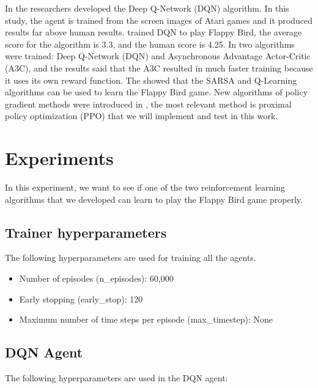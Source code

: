 \documentclass[letterpaper]{article}
\begin{document}
In \cite{mnih2013playing} the researchers developed the Deep Q-Network (DQN) algorithm. In this study, the agent is trained from the screen images of Atari games and it produced results far above human results. \cite{stanford2016alp} trained DQN to play Flappy Bird, the average score for the algorithm is 3.3, and the human score is 4.25. In \cite{alp2019playing} two algorithms were trained: Deep Q-Network (DQN) and Asynchronous Advantage Actor-Critic (A3C), and the results said that the A3C resulted in much faster training because it uses its own reward function. The \cite{vu2020flapai} showed that the SARSA and Q-Learning algorithms can be used to learn the Flappy Bird game. New algorithms of policy gradient methods were introduced in \cite{schulman2017proximal}, the most relevant method is proximal policy optimization (PPO) that we will implement and test in this work.

\section{Experiments}

In this experiment, we want to see if one of the two reinforcement learning algorithms that we developed can learn to play the Flappy Bird game properly.

\subsection{Trainer hyperparameters}

The following hyperparameters are used for training all the agents.

\begin{itemize}
    \item Number of episodes (n\_episodes): 60,000
    \item Early stopping (early\_stop): 120
    \item Maximum number of time steps per episode (max\_timestep): None
\end{itemize}

\subsection{DQN Agent}

The following hyperparameters are used in the DQN agent:
\end{document}
